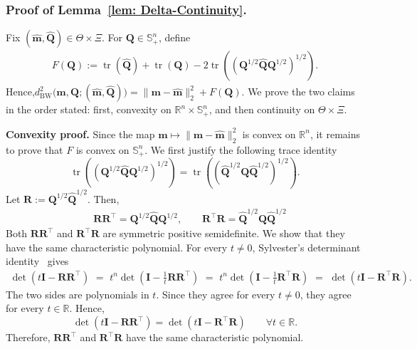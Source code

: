 \documentclass[opre,sglanonrev]{informs4}
\newcommand{\mbR}{\mathbb R}
\newcommand{\mbS}{\mathbb S}
\newcommand{\bmean}{\bm{m}}
\newcommand{\bI}{\bm{I}}
\newcommand{\bQ}{\bm Q}
\newcommand{\bR}{\bm{R}}
\newcommand{\Tr}{\operatorname{tr}}
\begin{document}
{\begin{APPENDICES}
\subsubsection{Proof of Lemma~\ref{lem: Delta-Continuity}. } 
Fix \((\hat{\bmean},\hat{\bQ})\in\Theta\times\Xi\). For
\(\bQ\in\mbS^n_+\), define
\begin{align}\label{eq:def-F-trace}
    F(\bQ)
:=
\Tr(\hat{\bQ})+\Tr(\bQ)
-
2\Tr\!\left((\bQ^{1/2}\hat{\bQ}\bQ^{1/2})^{1/2}\right).
\end{align}
Hence,$ d^2_{\mathrm{BW}}\bigl(\bmean,\bQ;(\hat{\bmean},\hat{\bQ})\bigr)
=
\|\bmean-\hat{\bmean}\|_2^2+F(\bQ)$. We prove the two claims in the order stated: first, convexity on
\(\mbR^n\times\mbS^n_+\), and then continuity on
\(\Theta\times\Xi\).

\medskip
\noindent\textbf{Convexity proof.} Since the map \(\bmean\mapsto \|\bmean-\hat{\bmean}\|_2^2\) is convex on
\(\mbR^n\), it remains to prove that \(F\) is convex on
\(\mbS^n_+\). We first justify the following trace identity
\begin{equation}\label{eq:BW-trace-switch}
\Tr\!\left((\bQ^{1/2}\hat{\bQ}\bQ^{1/2})^{1/2}\right)
=
\Tr\!\left((\hat{\bQ}^{1/2}\bQ\hat{\bQ}^{1/2})^{1/2}\right).
\end{equation}
Let $\bR:=\bQ^{1/2}\hat{\bQ}^{1/2}$. Then,\vspace{-2em}
\begin{align}\label{eq:trace-identity}
\quad \bR\bR^\top=\bQ^{1/2}\hat{\bQ}\bQ^{1/2},
\qquad
\bR^\top \bR=\hat{\bQ}^{1/2}\bQ\hat{\bQ}^{1/2}
\end{align}
Both \(\bR\bR^\top\) and \(\bR^\top \bR\) are symmetric positive semidefinite. We show that they have the same characteristic polynomial. For every \(t\neq0\),
Sylvester's determinant identity~\cite{horn2012matrix} gives
\[
\begin{aligned}
\det(t \bI-\bR\bR^\top) \,\,=\,\,t^n\det\!\left(\bI-\frac{1}{t}\bR\bR^\top\right) \,\,=\,\, t^n\det\!\left(\bI-\frac{1}{t}\bR^\top \bR\right) \,\,=\,\,\det(t \bI-\bR^\top \bR).
\end{aligned}
\]
The two sides are polynomials in \(t\). Since they agree for every \(t\neq0\),
they agree for every \(t\in\mbR\). Hence,
\[
\det(t \bI-\bR\bR^\top)=\det(t \bI-\bR^\top \bR)
\qquad \forall t\in\mbR.
\]
Therefore, \(\bR\bR^\top\) and \(\bR^\top \bR\) have the same characteristic polynomial.


\end{APPENDICES}}
\end{document}
